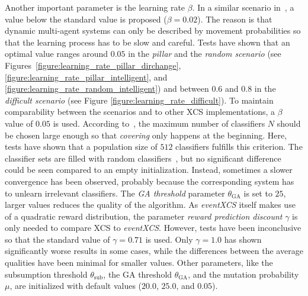 \documentclass{sig-alternate}
\begin{document}
Another important parameter is the learning rate $\beta$. In a similar scenario in~\cite{1102281}, a value below the standard value is proposed (\(\beta = 0.02\)). The reason is that dynamic multi-agent systems can only be described by movement probabilities so that the learning process has to be slow and careful. Tests have shown that an optimal value ranges around $0.05$ in the \emph{pillar} and the \emph{random scenario} (see Figures~\ref{figure:learning_rate_pillar_dirchange}, \ref{figure:learning_rate_pillar_intelligent}, and \ref{figure:learning_rate_random_intelligent}) and between $0.6$ and $0.8$ in the \emph{difficult scenario} (see Figure \ref{figure:learning_rate_difficult}). To maintain comparability between the scenarios and to other XCS implementations, a $\beta$ value of \(0.05\) is used.
According to~\cite{BW02}, the maximum number of classifiers $N$ should be chosen large enough so that \emph{covering} only happens at the beginning.
Here, tests have shown that a population size of $512$ classifiers fulfills this criterion. The classifier sets are filled with random classifiers~\cite{Butz2006}, but no significant difference could be seen compared to an empty initialization. Instead, sometimes a slower convergence has been observed, probably because the corresponding system has to unlearn irrelevant classifiers. The \emph{GA threshold} parameter $\theta_{\mathrm{GA}}$ is set to $25$, larger values reduces the quality of the algorithm. As \emph{eventXCS} itself makes use of a quadratic reward distribution, the parameter \emph{reward prediction discount} $\gamma$ is only needed to compare XCS to \emph{eventXCS}. However, tests have been inconclusive so that the standard value of $\gamma = 0.71$ is used. %
Only $\gamma = 1.0$ has shown significantly worse results in some cases, while the differences between the average qualities have been minimal for smaller values. %
Other parameters, like the subsumption threshold $\theta_{\mathrm{sub}}$, the GA threshold $\theta_{\mathrm{GA}}$, and the mutation probability $\mu$, are initialized with default values ($20.0$, $25.0$, and $0.05$).
\end{document}
